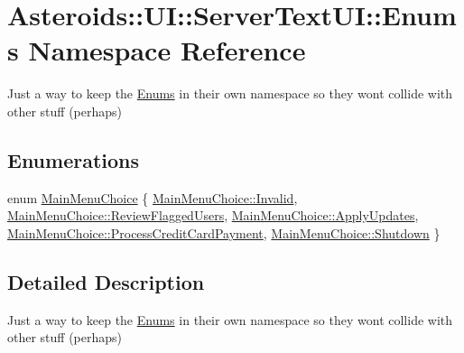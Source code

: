 \hypertarget{namespaceAsteroids_1_1UI_1_1ServerTextUI_1_1Enums}{}\section{Asteroids\+:\+:UI\+:\+:Server\+Text\+UI\+:\+:Enums Namespace Reference}
\label{namespaceAsteroids_1_1UI_1_1ServerTextUI_1_1Enums}


Just a way to keep the \hyperlink{namespaceAsteroids_1_1UI_1_1ServerTextUI_1_1Enums}{Enums} in their own namespace so they won\textquotesingle{}t collide with other stuff (perhaps)  


\subsection*{Enumerations}
\begin{DoxyCompactItemize}
\item 
enum \hyperlink{namespaceAsteroids_1_1UI_1_1ServerTextUI_1_1Enums_ab80731b6b7455a57d7247f6ac859af32}{Main\+Menu\+Choice} \{ \newline
\hyperlink{namespaceAsteroids_1_1UI_1_1ServerTextUI_1_1Enums_ab80731b6b7455a57d7247f6ac859af32a4bbb8f967da6d1a610596d7257179c2b}{Main\+Menu\+Choice\+::\+Invalid}, 
\hyperlink{namespaceAsteroids_1_1UI_1_1ServerTextUI_1_1Enums_ab80731b6b7455a57d7247f6ac859af32a45c4129d72793d7e6c813412e6d2bd07}{Main\+Menu\+Choice\+::\+Review\+Flagged\+Users}, 
\hyperlink{namespaceAsteroids_1_1UI_1_1ServerTextUI_1_1Enums_ab80731b6b7455a57d7247f6ac859af32a237045a25dd289c0e6a638bc151f9f0a}{Main\+Menu\+Choice\+::\+Apply\+Updates}, 
\hyperlink{namespaceAsteroids_1_1UI_1_1ServerTextUI_1_1Enums_ab80731b6b7455a57d7247f6ac859af32a69f2645cf78ad572000de5679585c520}{Main\+Menu\+Choice\+::\+Process\+Credit\+Card\+Payment}, 
\newline
\hyperlink{namespaceAsteroids_1_1UI_1_1ServerTextUI_1_1Enums_ab80731b6b7455a57d7247f6ac859af32a1a4ebb180ba59b067782515ffee6e975}{Main\+Menu\+Choice\+::\+Shutdown}
 \}
\end{DoxyCompactItemize}


\subsection{Detailed Description}
Just a way to keep the \hyperlink{namespaceAsteroids_1_1UI_1_1ServerTextUI_1_1Enums}{Enums} in their own namespace so they won\textquotesingle{}t collide with other stuff (perhaps) 

